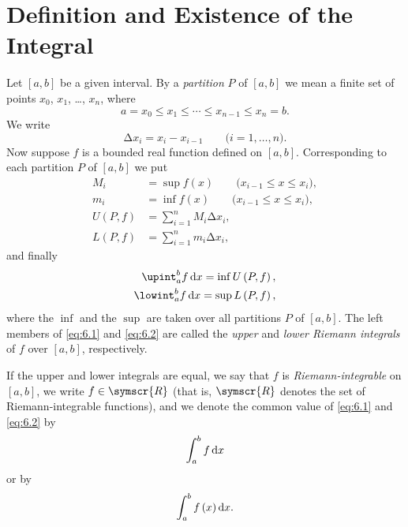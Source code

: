 \section{Definition and Existence of the Integral}

\begin{definition}\label{definition:6.1}
    Let \(\left[a,b\right]\) be a given interval. By a \emph{partition} \(P\) of \(\left[a,b\right]\) we mean a finite set of points \(x_0\), \(x_1\), \ldots, \(x_n\), where
    \begin{equation*}
        a=x_0\leqslant x_1\leqslant\cdots\leqslant x_{n-1}\leqslant x_n=b.
    \end{equation*}
    We write
    \begin{equation*}
        \increment x_i=x_i-x_{i-1}\qquad\text{(\(i=1,\ldots,n\))}.
    \end{equation*}
    Now suppose \(f\) is a bounded real function defined on \(\left[a,b\right]\). Corresponding to each partition \(P\) of \(\left[a,b\right]\) we put
    \begin{align*}
        M_i&=\sup f\left(x\right)\qquad\text{(\(x_{i-1}\leqslant x\leqslant x_i\))},\\
        m_i&=\inf f\left(x\right)\qquad\text{(\(x_{i-1}\leqslant x\leqslant x_i\))},\\
        U\left(P,f\right)&=\sum_{i=1}^nM_i\increment x_i,\\
        L\left(P,f\right)&=\sum_{i=1}^nm_i\increment x_i,
    \end{align*}
    and finally
    \begin{align}
        \upint_a^bf\odif{x}=\inf U\left(P,f\right),\label{eq:6.1}\\
        \lowint_a^bf\odif{x}=\sup L\left(P,f\right),\label{eq:6.2}
    \end{align}
    where the \(\inf\) and the \(\sup\) are taken over all partitions \(P\) of \(\left[a,b\right]\). The left members of \eqref{eq:6.1} and \eqref{eq:6.2} are called the \emph{upper} and \emph{lower Riemann integrals} of \(f\) over \(\left[a,b\right]\), respectively.

    If the upper and lower integrals are equal, we say that \(f\) is \emph{Riemann-integrable} on \(\left[a,b\right]\), we write \(f\in\symscr{R}\) (that is, \(\symscr{R}\) denotes the set of Riemann-integrable functions), and we denote the common value of \eqref{eq:6.1} and \eqref{eq:6.2} by
    \begin{equation}
        \int_a^bf\odif{x}
    \end{equation}
    or by
    \begin{equation}
        \int_a^bf\left(x\right)\odif{x}.
    \end{equation}


\end{definition}
